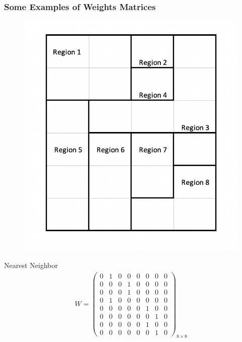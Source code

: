 \documentclass[
  shownotes,
  xcolor={svgnames},
  hyperref={colorlinks,citecolor=DarkBlue,linkcolor=DarkRed,urlcolor=DarkBlue}
  ]{beamer}
\begin{document}
\begin{frame}[fragile]
\frametitle{Some Examples of Weights Matrices}


\begin{minipage}[t]{0.53\linewidth}
  \begin{figure}[H] \centering
    \captionsetup{justification=centering}
    \includegraphics[scale=0.6]{figures/regions_example}
   \end{figure}
  
    \end{minipage}
    \hfill
\begin{minipage}[t]{0.43\linewidth}%
\scriptsize
Nearest Neighbor
\begin{align}
W=\left(\begin{array}{cccccccc}
0 & 1 & 0 & 0 & 0 & 0 & 0 & 0\\
0 & 0 & 0 & 1 & 0 & 0 & 0 & 0\\
0 & 0 & 0 & 1 & 0 & 0 & 0 & 0\\
0 & 1 & 0 & 0 & 0 & 0 & 0 & 0\\
0 & 0 & 0 & 0 & 0 & 1 & 0 & 0\\
0 & 0 & 0 & 0 & 0 & 0 & 1 & 0\\
0 & 0 & 0 & 0 & 0 & 1 & 0 & 0\\
0 & 0 & 0 & 0 & 0 & 0 & 1 & 0
\end{array}\right)_{8\times8} \nonumber
\end{align}
\end{minipage}


\end{frame}
\end{document}
